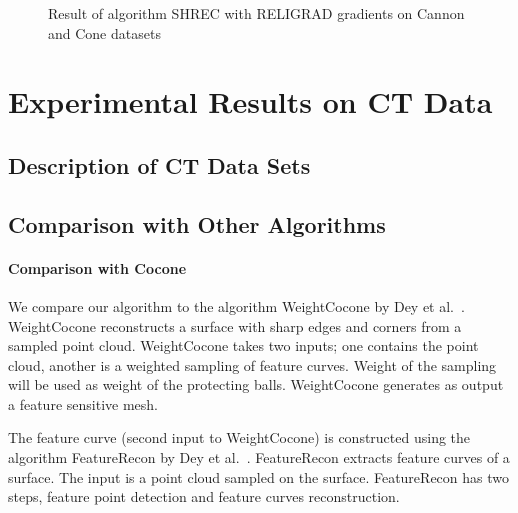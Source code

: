 \begin{figure}[tb]
	\caption{Result of algorithm SHREC with RELIGRAD gradients on Cannon and Cone datasets}
	\label{fig:cannon_cone}
\end{figure}
\section{Experimental Results on CT Data}

\subsection{Description of CT Data Sets}

\subsection{Comparison with Other Algorithms}
\paragraph{Comparison with Cocone}
We compare our algorithm to the algorithm WeightCocone by Dey et al.~\cite{Dey2012}. WeightCocone reconstructs a surface with sharp edges and corners from a sampled point cloud. WeightCocone takes two inputs; one contains the point cloud, another is a weighted sampling of feature curves. Weight of the sampling will be used as weight of the protecting balls. WeightCocone generates as output a feature sensitive mesh. 

The feature curve (second input to WeightCocone) is constructed using the algorithm FeatureRecon by Dey et al.~\cite{Dey2013}. FeatureRecon extracts feature curves of a surface. The input is a point cloud sampled on the surface. FeatureRecon has two steps, feature point detection and feature curves reconstruction. 
